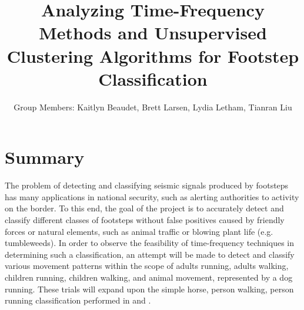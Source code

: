 \documentclass{article}[11pt]
\title{Analyzing Time-Frequency Methods and Unsupervised Clustering Algorithms for Footstep Classification}
\author{Group Members: Kaitlyn Beaudet, Brett Larsen, Lydia Letham, Tianran Liu}
\date{}
\begin{document}
\maketitle
\doublespace

\section{Summary}
\label{sec:summary}
The problem of detecting and classifying seismic signals produced by footsteps has many applications in national security, such as alerting authorities to activity on the border. To this end, the goal of the project is to accurately detect and classify different classes of footsteps without false positives caused by friendly forces or natural elements, such as animal traffic or blowing plant life (e.g. tumbleweeds). In order to observe the feasibility of time-frequency techniques in determining such a classification, an attempt will be made to detect and classify various movement patterns within the scope of adults running, adults walking, children running, children walking, and animal movement, represented by a dog running.  These trials will expand upon the simple horse, person walking, person running classification performed in \cite{Damarla2011} and \cite{Mehmood2012}.
\end{document}
